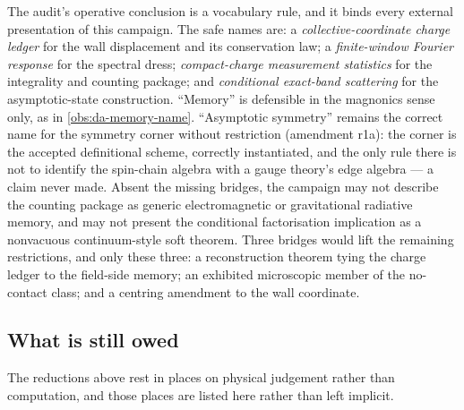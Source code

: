 \begin{observation}
\label{obs:da-naming}
The audit's operative conclusion is a vocabulary rule, and it binds every
external presentation of this campaign. The safe names are: a
\emph{collective-coordinate charge ledger} for the wall displacement and its
conservation law; a \emph{finite-window Fourier response} for the spectral
dress; \emph{compact-charge measurement statistics} for the integrality and
counting package; and \emph{conditional exact-band scattering} for the
asymptotic-state construction. ``Memory'' is defensible in the magnonics sense
only, as in \cref{obs:da-memory-name}. ``Asymptotic symmetry'' remains the
correct name for the symmetry corner without restriction (amendment r1a): the
corner is the accepted definitional scheme, correctly instantiated, and the
only rule there is not to identify the spin-chain algebra with a gauge
theory's edge algebra --- a claim never made. Absent the missing bridges, the
campaign may not describe the counting package as generic electromagnetic or
gravitational radiative memory, and may not present the conditional
factorisation implication as a nonvacuous continuum-style soft theorem. Three
bridges would lift the remaining restrictions, and only these three: a
reconstruction theorem tying the charge ledger to the field-side memory; an
exhibited microscopic member of the no-contact class; and a centring
amendment to the wall coordinate.
\end{observation}


\subsection{What is still owed}

The reductions above rest in places on physical judgement rather than
computation, and those places are listed here rather than left implicit.

